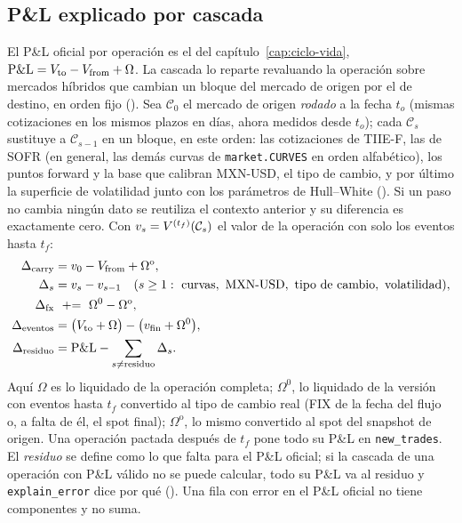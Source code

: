 \subsection{P\&L explicado por cascada}\label{sec:cap09-explain}

El P\&L oficial por operación es el del capítulo~\ref{cap:ciclo-vida}, $\mathrm{P\&L}=V_{\mathrm{to}}-V_{\mathrm{from}}+\Omega$. La cascada lo reparte revaluando la operación sobre mercados híbridos que cambian un bloque del mercado de origen por el de destino, en orden fijo (). Sea $\mathcal C_0$ el mercado de origen \emph{rodado} a la fecha $t_o$ (mismas cotizaciones en los mismos plazos en días, ahora medidos desde $t_o$); cada $\mathcal C_s$ sustituye a $\mathcal C_{s-1}$ en un bloque, en este orden: las cotizaciones de TIIE-F, las de SOFR (en general, las demás curvas de \texttt{market.CURVES} en orden alfabético), los puntos forward y la base que calibran MXN-USD, el tipo de cambio, y por último la superficie de volatilidad junto con los parámetros de Hull--White (). Si un paso no cambia ningún dato se reutiliza el contexto anterior y su diferencia es exactamente cero. Con $v_s=V^{(t_f)}(\mathcal C_s)$ el valor de la operación con solo los eventos hasta $t_f$:
\begin{align}
  \Delta_{\mathrm{carry}}&=v_0-V_{\mathrm{from}}+\Omega^{\mathrm{o}},\label{eq:cap09-carry}\\
  \Delta_s&=v_s-v_{s-1}\quad(s\ge1:\ \text{curvas},\ \text{MXN-USD},\ \text{tipo de cambio},\ \text{volatilidad}),\label{eq:cap09-paso}\\
  \Delta_{\mathrm{fx}}&\ \mathrel{+}=\ \Omega^{0}-\Omega^{\mathrm{o}},\label{eq:cap09-fx-liquidado}\\
  \Delta_{\mathrm{eventos}}&=\bigl(V_{\mathrm{to}}+\Omega\bigr)-\bigl(v_{\mathrm{fin}}+\Omega^{0}\bigr),\label{eq:cap09-eventos}\\
  \Delta_{\mathrm{residuo}}&=\PnL-\sum_{s\ne\mathrm{residuo}}\Delta_s .\label{eq:cap09-residuo}
\end{align}
Aquí $\Omega$ es lo liquidado de la operación completa; $\Omega^{0}$, lo liquidado de la versión con eventos hasta $t_f$ convertido al tipo de cambio real (FIX de la fecha del flujo o, a falta de él, el spot final); $\Omega^{\mathrm{o}}$, lo mismo convertido al spot del snapshot de origen. Una operación pactada después de $t_f$ pone todo su P\&L en \texttt{new\_trades}. El \emph{residuo} se define como lo que falta para el P\&L oficial; si la cascada de una operación con P\&L válido no se puede calcular, todo su P\&L va al residuo y \texttt{explain\_error} dice por qué (). Una fila con error en el P\&L oficial no tiene componentes y no suma.


